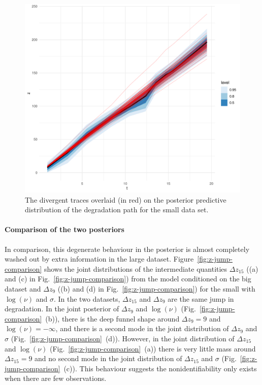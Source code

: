 \begin{figure}
  \centering
  \includegraphics[width=0.8\columnwidth]{./figures/ch-4/zppd-divergencies.pdf}
  \caption{The divergent traces overlaid (in red) on the posterior predictive distribution of the degradation path for the small data set.}
  \label{fig:z-ppd-divergent}
\end{figure}

\paragraph*{Comparison of the two posteriors}
In comparison, this degenerate behaviour in the posterior is almost completely washed out by extra information in the large dataset. Figure~\ref{fig:z-jump-comparison} shows the joint distributions of the intermediate quantities $\Delta z_{15}$ ((a) and (c) in Fig.~\ref{fig:z-jump-comparison}) from the model conditioned on the big dataset and $\Delta z_{9}$ ((b) and (d) in Fig.~\ref{fig:z-jump-comparison}) for the small with $\log(\nu)$ and $\sigma$. In the two datasets, $\Delta z_{15}$ and $\Delta z_{9}$ are the same jump in degradation. In the joint posterior of $\Delta z_{9}$ and $\log(\nu)$ (Fig.~\ref{fig:z-jump-comparison}~(b)), there is the deep funnel shape around $\Delta z_{9} = 9$ and $\log(\nu) = -\infty$, and there is a second mode in the joint distribution of $\Delta z_{9}$ and $\sigma$ (Fig.~\ref{fig:z-jump-comparison}~(d)). However, in the joint distribution of $\Delta z_{15}$ and $\log(\nu)$ (Fig.~\ref{fig:z-jump-comparison}~(a)) there is very little mass around $\Delta z_{15} = 9$ and no second mode in the joint distribution of $\Delta z_{15}$ and $\sigma$ (Fig.~\ref{fig:z-jump-comparison}~(c)). This behaviour suggests the nonidentifiability only exists when there are few observations.

